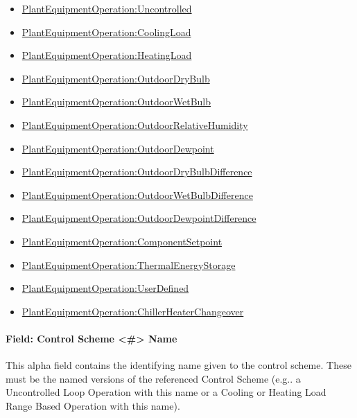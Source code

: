 \begin{itemize}
\item
  \hyperref[plantequipmentoperationuncontrolled]{PlantEquipmentOperation:Uncontrolled}
\item
  \hyperref[plantequipmentoperationcoolingload]{PlantEquipmentOperation:CoolingLoad}
\item
  \hyperref[plantequipmentoperationheatingload]{PlantEquipmentOperation:HeatingLoad}
\item
  \hyperref[plantequipmentoperationoutdoordrybulb]{PlantEquipmentOperation:OutdoorDryBulb}
\item
  \hyperref[plantequipmentoperationoutdoorwetbulb]{PlantEquipmentOperation:OutdoorWetBulb}
\item
  \hyperref[plantequipmentoperationoutdoorrelativehumidity]{PlantEquipmentOperation:OutdoorRelativeHumidity}
\item
  \hyperref[plantequipmentoperationoutdoordewpoint]{PlantEquipmentOperation:OutdoorDewpoint}
\item
  \hyperref[plantequipmentoperationoutdoordrybulbdifference]{PlantEquipmentOperation:OutdoorDryBulbDifference}
\item
  \hyperref[plantequipmentoperationoutdoorwetbulbdifference]{PlantEquipmentOperation:OutdoorWetBulbDifference}
\item
  \hyperref[plantequipmentoperationoutdoordewpointdifference]{PlantEquipmentOperation:OutdoorDewpointDifference}
\item
  \hyperref[plantequipmentoperationcomponentsetpoint]{PlantEquipmentOperation:ComponentSetpoint}
\item
  \hyperref[plantequipmentoperationthermalenergystorage]{PlantEquipmentOperation:ThermalEnergyStorage}
\item
  \hyperref[plantequipmentoperationuserdefined]{PlantEquipmentOperation:UserDefined}
\item
  \hyperref[plantequipmentoperationchillerheaterchangeover]{PlantEquipmentOperation:ChillerHeaterChangeover}
\end{itemize}

\paragraph{Field: Control Scheme \textless{}\#\textgreater{} Name}\label{field-control-scheme-name}

This alpha field contains the identifying name given to the control scheme. These must be the named versions of the referenced Control Scheme (e.g.. a Uncontrolled Loop Operation with this name or a Cooling or Heating Load Range Based Operation with this name).

